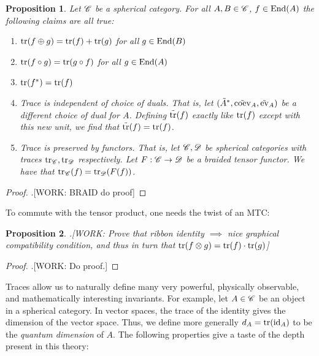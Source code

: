 \documentclass{article}
\newtheorem{proposition}{Proposition}[section]
\theoremstyle{definition}
\numberwithin{figure}{section}
\begin{document}
\begin{proposition}\label{trace} Let $\mathscr{C}$ be a spherical category. For all $A,B\in \mathscr{C}$, $f\in \mathrm{End}(A)$ the following claims are all true:

\begin{enumerate}
\item $\mathrm{tr}(f\oplus g)=\mathrm{tr}(f)+\mathrm{tr}(g)$ for all $g\in \mathrm{End}(B)$
\item $\mathrm{tr}(f\circ g)=\mathrm{tr}(g\circ f)$ for all $g\in \mathrm{End}(A)$
\item $\mathrm{tr}(f^{*})=\mathrm{tr}(f)$
\item Trace is independent of choice of duals. That is, let $(\tilde{A}^*,\tilde{\mathrm{coev}}_{A}, \tilde{\mathrm{ev}}_A)$ be a different choice of dual for $A$. Defining $\tilde{\mathrm{tr}}(f)$ exactly like $\mathrm{tr}(f)$ except with this new unit, we find that $\tilde{\mathrm{tr}}(f)=\mathrm{tr}(f)$.
\item Trace is preserved by functors. That is, let $\mathscr{C},\mathscr{D}$ be spherical categories with traces $\mathrm{tr}_{\mathscr{C}},\mathrm{tr}_{\mathscr{D}}$ respectively. Let $F:\mathscr{C}\to \mathscr{D}$ be a braided tensor functor. We have that $\mathrm{tr}_{\mathscr{C}}(f)=\mathrm{tr}_{\mathscr{D}}(F(f))$.
\end{enumerate}

\end{proposition}
\begin{proof} .[WORK: BRAID do proof]
\end{proof}

To commute with the tensor product, one needs the twist of an MTC:

\begin{proposition} .[WORK: Prove that ribbon identity $\implies$ nice graphical compatibility condition, and thus in turn that $\mathrm{tr}(f\otimes g)=\mathrm{tr}(f)\cdot \mathrm{tr}(g)$]
\end{proposition}
\begin{proof}.[WORK: Do proof.]
\end{proof}

Traces allow us to naturally define many very powerful, physically observable, and mathematically interesting invariants. For example, let $A\in \mathscr{C}$ be an object in a spherical category. In vector spaces, the trace of the identity gives the dimension of the vector space. Thus, we define more generally $d_A=\mathrm{tr}(\mathrm{id}_A)$ to be the \textit{quantum dimension} of $A$. The following properties give a taste of the depth present in this theory:
\end{document}
